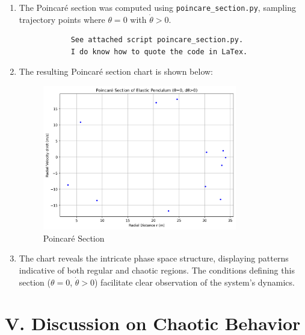\documentclass{article}
\begin{document}
	\begin{enumerate}
		\item The Poincaré section was computed using \texttt{poincare\_section.py}, sampling trajectory points where $\theta = 0$ with $\dot{\theta} > 0$.
			\begin{lstlisting}
			See attached script poincare_section.py.
			I do know how to quote the code in LaTex.
			\end{lstlisting}
			
		
		\item The resulting Poincaré section chart is shown below:
		
		\begin{figure}[h!]
			\centering
			\includegraphics[width=0.8\textwidth]{poincare_section.png}
			\caption{Poincaré Section}
		\end{figure}
		
		\item The chart reveals the intricate phase space structure, displaying patterns indicative of both regular and chaotic regions. The conditions defining this section ($\theta = 0$, $\dot{\theta} > 0$) facilitate clear observation of the system's dynamics.
	\end{enumerate}
	\pagebreak
	
	\section*{V. Discussion on Chaotic Behavior}
	
\end{document}
